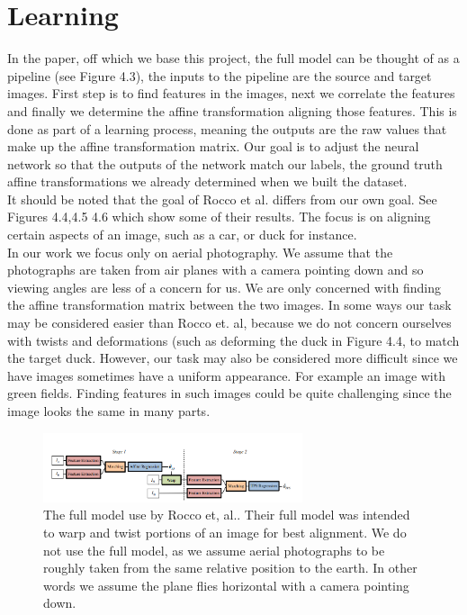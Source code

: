 \section{Learning}
In the paper\citep{Rocco17}, off which we base this project, the full model can be thought of as a pipeline (see Figure 4.3), the inputs to the pipeline are the source and target images. First step is to find features in the images, next we correlate the features and finally we determine the affine transformation aligning those features. This is done as part of a learning process, meaning the outputs are the raw values that make up the affine transformation matrix. Our goal is to adjust the neural network so that the outputs of the network match our labels, the ground truth affine transformations we already determined when we built the dataset.\\
  It should be noted that the goal of Rocco et al. \cite{Rocco17} differs from our own goal. See Figures 4.4,4.5 4.6 which show some of their results. The focus is on aligning certain aspects of an image, such as a car, or duck for instance.\\
  In our work we focus only on aerial photography. We assume that the photographs are taken from air planes with a camera pointing down and so viewing angles are less of a concern for us. We are only concerned with finding the affine transformation matrix between the two images. In some ways our task may be considered easier than Rocco et. al, because we do not concern ourselves with twists and deformations (such as deforming the duck in Figure 4.4, to match the target duck. However, our task may also be considered more difficult since we have images sometimes have a uniform appearance. For example an image with green fields. Finding features in such images could be quite challenging since the image looks the same in many parts.
\begin{figure}
\centering
\includegraphics[width = 3.0in]{figs/full_arch}
\caption{The full model use by Rocco et, al.\cite{cnngeometric_pytorch}. Their full model was intended to warp and twist portions of an image for best alignment. We do not use the full model, as we assume aerial photographs to be roughly taken from the same relative position to the earth. In other words we assume the plane flies horizontal with a camera pointing down.}
\end{figure}
